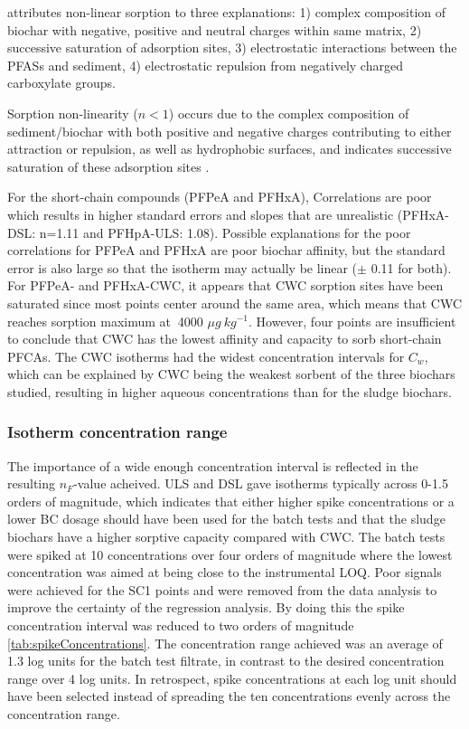 \citep{yin2022insights} attributes non-linear sorption to three explanations: 1) complex composition of biochar with negative, positive and neutral charges within same matrix, 2) successive saturation of adsorption sites, 3) electrostatic interactions between the PFASs and sediment, 4) electrostatic repulsion from negatively charged carboxylate groups. 

Sorption non-linearity ($n<1$) occurs due to the complex composition of sediment/biochar with both positive and negative charges contributing to either attraction or repulsion, as well as hydrophobic surfaces, and indicates successive saturation of these adsorption sites \citep{yin2022insights}.  

For the short-chain compounds (PFPeA and PFHxA), Correlations are poor which results in higher standard errors and slopes that are unrealistic (PFHxA-DSL: n=1.11 and PFHpA-ULS: 1.08). Possible explanations for the poor correlations for PFPeA and PFHxA are poor biochar affinity, but the standard error is also large so that the isotherm may actually be linear ($\pm$ 0.11 for both). For PFPeA- and PFHxA-CWC, it appears that CWC sorption sites have been saturated since most points center around the same area, which means that CWC reaches sorption maximum at $~$4000 $\mu g~kg^{-1}$. However, four points are insufficient to conclude that CWC has the lowest affinity and capacity to sorb short-chain PFCAs. The CWC isotherms had the widest concentration intervals for $C_w$, which can be explained by CWC being the weakest sorbent of the three biochars studied, resulting in higher aqueous concentrations than for the sludge biochars. 

\subsubsection{Isotherm concentration range}
The importance of a wide enough concentration interval is reflected in the resulting $n_F$-value acheived. ULS and DSL gave isotherms typically across 0-1.5 orders of magnitude, which indicates that either higher spike concentrations or a lower BC dosage should have been used for the batch tests and that the sludge biochars have a higher sorptive capacity compared with CWC. The batch tests were spiked at 10 concentrations over four orders of magnitude where the lowest concentration was aimed at being close to the instrumental LOQ. Poor signals were achieved for the SC1 points and were removed from the data analysis to improve the certainty of the regression analysis. By doing this the spike concentration interval was reduced to two orders of magnitude \cref{tab:spikeConcentrations}. The concentration range achieved was an average of 1.3 log units for the batch test filtrate, in contrast to the desired concentration range over 4 log units. In retrospect, spike concentrations at each log unit should have been selected instead of spreading the ten concentrations evenly across the concentration range. 

